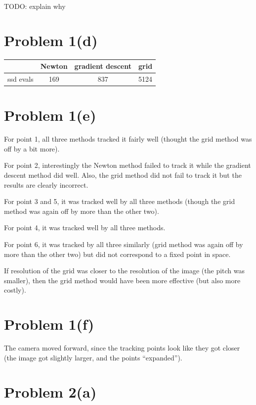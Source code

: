 \documentclass{article}
\begin{document}
TODO: explain why

\section*{Problem 1(d)}


\begin{center}
\begin{tabular}{ ||c||c|c|c|| } 
	\hline
				& Newton & gradient descent & grid \\ \hline
	ssd evals 	& 169 & 837 & 5124\\

\hline
\end{tabular}
\end{center}

\section*{Problem 1(e)}

For point 1, all three methods tracked it fairly well (thought the grid method was off by a bit more).

For point 2, interestingly the Newton method failed to track it while the gradient descent method did well. Also, the grid method did not fail to track it but the results are clearly incorrect.

For point 3 and 5, it was tracked well by all three methods (though the grid method was again off by more than the other two).

For point 4, it was tracked well by all three methods.

For point 6, it was tracked by all three similarly (grid method was again off by more than the other two) but did not correspond to a fixed point in space.

If resolution of the grid was closer to the resolution of the image (the pitch was smaller), then the grid method would have been more effective (but also more costly).

\section*{Problem 1(f)}

The camera moved forward, since the tracking points look like they got closer (the image got slightly larger, and the points ``expanded'').

\section*{Problem 2(a)}
\end{document}
